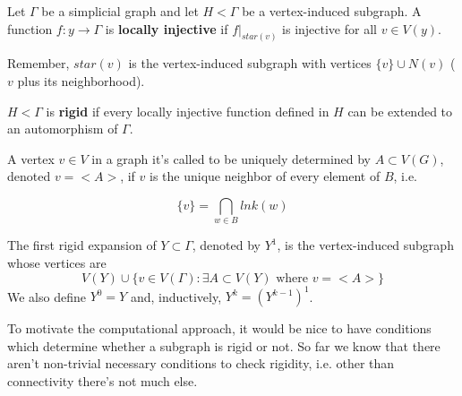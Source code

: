\begin{defini}
Let $\Gamma$ be a simplicial graph and let $H<\Gamma$ be a vertex-induced subgraph. A function $f:y\to \Gamma$ is \textbf{locally injective} if $f|_{star(v)}$ is injective for all $v \in V(y)$. 
\end{defini}

\begin{nota}
Remember, $star(v)$ is the vertex-induced subgraph with vertices $\{ v \} \cup N(v)$ ($v$ plus its neighborhood).
\end{nota}

\begin{defini}
$H<\Gamma$ is \textbf{rigid} if every locally injective function defined in $H$ can be extended to an automorphism of $\Gamma$. \end{defini}

A vertex $v \in V$ in a graph it's called to be uniquely determined by $A\subset V(G)$, denoted $v=<A>$, if $v$ is the unique neighbor of every element of $B$, i.e.

$$ \{ v \} = \bigcap_{w\in B} lnk(w) $$

\begin{defini}
The first rigid expansion of $Y\subset \Gamma$, denoted by $Y^{1}$, is the vertex-induced subgraph whose vertices are
$$ V(Y) \cup \{ v\in V(\Gamma) :  \exists A \subset V(Y) \text{ where } v = <A>  \}$$
We also define $Y^{0} = Y$ and, inductively, $Y^{k} = (Y^{k-1})^{1}$.\textbf{}
\end{defini}


To motivate the computational approach, it would be nice to have conditions which determine whether a subgraph is rigid or not. So far we know that there aren't non-trivial necessary conditions to check rigidity, i.e. other than connectivity there's not much else.